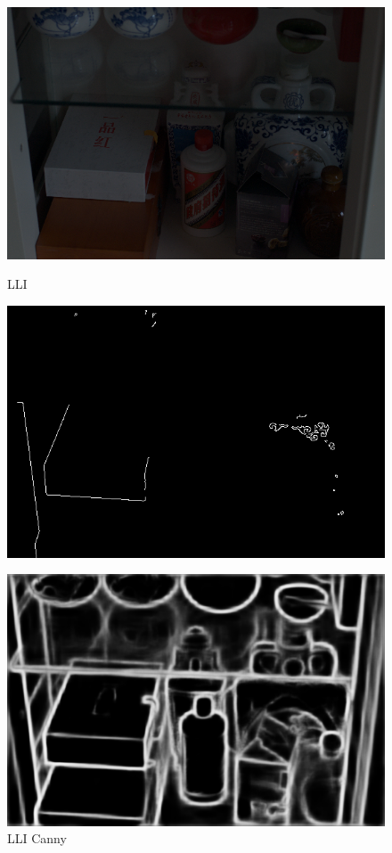\documentclass[CJK,aspectratio=169]{beamer}  %
\begin{document}
	\begin{frame}
		\begin{figure}
			\centering
			\begin{minipage}{.19\textwidth}
				\centering
				\includegraphics[width=.8\linewidth]{picture/LLIE/My Architecture/Edge Detection/low00044}
				\captionsetup{font=scriptsize}
				\label{fig: LLI}
				\caption*{LLI}
			\end{minipage}
			\begin{minipage}{.19\textwidth}
				\centering
				\includegraphics[width=.8\linewidth]{picture/LLIE/My Architecture/Edge Detection/low00044_canny}
				\captionsetup{font=scriptsize}
				\label{fig: LLI_canny}	
				\caption*{LLI Canny}
			\end{minipage}
			\begin{minipage}{.19\textwidth}
				\centering
				\includegraphics[width=.8\linewidth]{picture/LLIE/My Architecture/Edge Detection/low00044_rcf}

\end{minipage}
\end{figure}
\end{frame}
\end{document}
